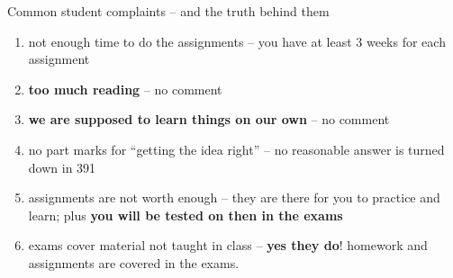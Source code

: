 \documentclass[xcolor={usenames,dvipsnames}]{beamer}
\begin{document}

\begin{frame}{Common student complaints -- and the truth behind them}

\begin{enumerate}[label=\arabic* - ]
\item not enough time to do the assignments -- \alert{you have at least 3 weeks for each assignment}

\item \textbf{too much reading} -- \alert{no comment}

\item \textbf{we are supposed to learn things on our own} -- \alert{no comment}

\item no part marks for ``getting the idea right'' -- \alert{no reasonable answer is turned down in 391}

\item assignments are not worth enough -- \alert{they are there for you to practice and learn; plus \textbf{you will be tested on then in the exams}}

\item exams cover material not taught in class -- \alert{\textbf{yes they do}! homework and assignments are covered in the exams.}
\end{enumerate}


\end{frame}
\end{document}
